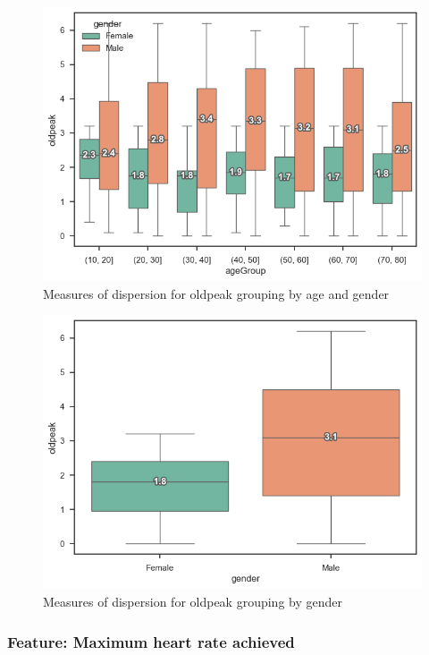 \begin{figure}
    \caption{Measures of dispersion for oldpeak grouping by age and gender}\label{boxplot-oldpeak-age}
    \centering
    \includegraphics[width=\linewidth]{media/boxplot-01-agegroup-gender-oldpeak.png}
\end{figure}

\begin{figure}
    \caption{Measures of dispersion for oldpeak grouping by gender}\label{boxplot-oldpeak-gender}
    \centering
    \includegraphics[width=\linewidth]{media/boxplot-02-gender-oldpeak.png}
\end{figure}

\subsubsection{Feature: Maximum heart rate achieved}

